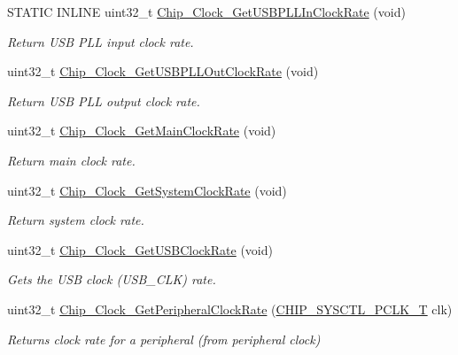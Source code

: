 \begin{DoxyCompactItemize}
S\+T\+A\+T\+I\+C I\+N\+L\+I\+N\+E uint32\+\_\+t \hyperlink{group___c_l_o_c_k__17_x_x__40_x_x_gaa97e3b970f577ea06e5d4f76097576c7}{Chip\+\_\+\+Clock\+\_\+\+Get\+U\+S\+B\+P\+L\+L\+In\+Clock\+Rate} (void)
\begin{DoxyCompactList}\small\item\em Return U\+S\+B P\+L\+L input clock rate. \end{DoxyCompactList}\item 
uint32\+\_\+t \hyperlink{group___c_l_o_c_k__17_x_x__40_x_x_ga89cab6cddba486f9c820b06e0a28bade}{Chip\+\_\+\+Clock\+\_\+\+Get\+U\+S\+B\+P\+L\+L\+Out\+Clock\+Rate} (void)
\begin{DoxyCompactList}\small\item\em Return U\+S\+B P\+L\+L output clock rate. \end{DoxyCompactList}\item 
uint32\+\_\+t \hyperlink{group___c_l_o_c_k__17_x_x__40_x_x_gaf5319079ca1531102c01860d05a69960}{Chip\+\_\+\+Clock\+\_\+\+Get\+Main\+Clock\+Rate} (void)
\begin{DoxyCompactList}\small\item\em Return main clock rate. \end{DoxyCompactList}\item 
uint32\+\_\+t \hyperlink{group___c_l_o_c_k__17_x_x__40_x_x_gaf3dd97239f9db511dbc71c531132cc08}{Chip\+\_\+\+Clock\+\_\+\+Get\+System\+Clock\+Rate} (void)
\begin{DoxyCompactList}\small\item\em Return system clock rate. \end{DoxyCompactList}\item 
uint32\+\_\+t \hyperlink{group___c_l_o_c_k__17_x_x__40_x_x_gac8679aba3cc005f859604a09ceceb4a4}{Chip\+\_\+\+Clock\+\_\+\+Get\+U\+S\+B\+Clock\+Rate} (void)
\begin{DoxyCompactList}\small\item\em Gets the U\+S\+B clock (U\+S\+B\+\_\+\+C\+L\+K) rate. \end{DoxyCompactList}\item 
uint32\+\_\+t \hyperlink{group___c_l_o_c_k__17_x_x__40_x_x_ga9c2bc86c857119426aa6a724c12a6f42}{Chip\+\_\+\+Clock\+\_\+\+Get\+Peripheral\+Clock\+Rate} (\hyperlink{group___c_l_o_c_k__17_x_x__40_x_x_ga7af78c5752bdd11a908ec9b11e2ecffc}{C\+H\+I\+P\+\_\+\+S\+Y\+S\+C\+T\+L\+\_\+\+P\+C\+L\+K\+\_\+\+T} clk)
\begin{DoxyCompactList}\small\item\em Returns clock rate for a peripheral (from peripheral clock) \end{DoxyCompactList}\item 

\end{DoxyCompactItemize}
